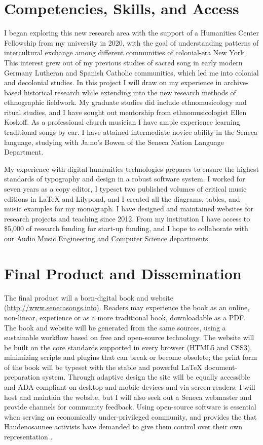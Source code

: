 \documentclass{neh}
\begin{document}
\section{Competencies, Skills, and Access}

I began exploring this new research area with the support of a Humanities
Center Fellowship from my university in 2020, with the goal of understanding
patterns of intercultural exchange among different communities of colonial-era
New York.
This interest grew out of my previous studies of sacred song in early modern
Germany Lutheran and Spanish Catholic communities, which led me into colonial
and decolonial studies.
In this project I will draw on my experience in archive-based historical
research while extending into the new research methods of ethnographic
fieldwork.
My graduate studies did include ethnomusicology and ritual studies, and I have
sought out mentorship from ethnomusicologist Ellen Koskoff.
As a professional church musician I have ample experience learning traditional
songs by ear.
I have attained intermediate novice ability in the Seneca language, studying
with Ja:no’s Bowen of the Seneca Nation Language Department.

My experience with digital humanities technologies prepares to ensure the
highest standards of typography and design in a robust software system.
I worked for seven years as a copy editor, I typeset two published volumes
of critical music editions in \LaTeX{} and Lilypond, and I created all the
diagrams, tables, and music examples for my monograph.
I have designed and maintained websites for research projects and teaching
since 2012.
From my institution I have access to \$5,000 of research funding for start-up
funding, and I hope to collaborate with our Audio Music Engineering and
Computer Science departments.
\section{Final Product and Dissemination}

The final product will a born-digital book and website
(\url{http://www.senecasongs.info}).
Readers may experience the book as an online, non-linear, experience or as a
more traditional book, downloadable as a PDF.
The book and website will be generated from the same sources, using a
sustainable workflow based on free and open-source technology.
The website will be built on the core standards supported in every browser
(HTML5 and CSS3), minimizing scripts and plugins that can break or become
obsolete; the print form of the book will be typeset with the stable and
powerful \LaTeX{} document-preparation system.
Through adaptive design the site will be equally accessible and ADA-compliant
on desktop and mobile devices and via screen readers.
I will host and maintain the website, but I will also seek out a Seneca
webmaster and provide channels for community feedback.
Using open-source software is essential when serving an economically
under-privileged community, and provides the 
that Haudenosaunee activists have demanded to give them control
over their own representation
\autocite{BasicCall}.
\end{document}
